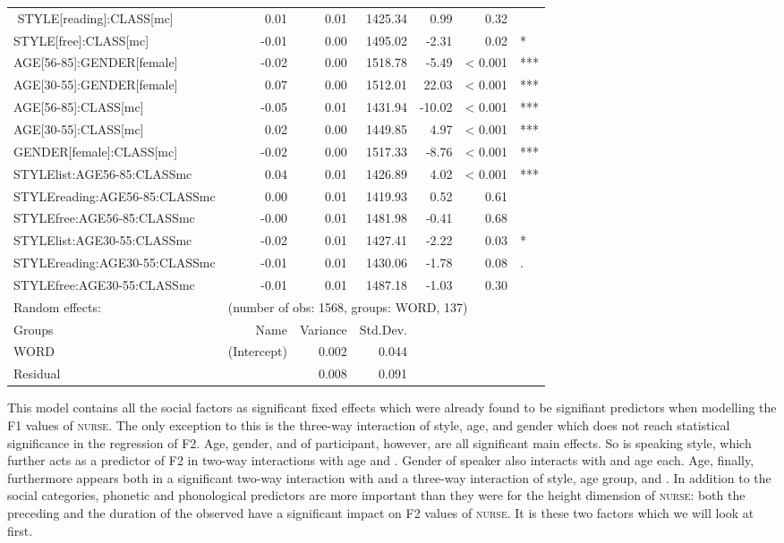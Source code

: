 {\begin{longtable}[c]{p{}rrrrrl}
$$		STYLE[reading]:CLASS[mc] & 0.01 & 0.01 & 1425.34 & 0.99 & 0.32 & \\ 
		STYLE[free]:CLASS[mc] & -0.01 & 0.00 & 1495.02 & -2.31 & 0.02 & *\\ 
		AGE[56-85]:GENDER[female] & -0.02 & 0.00 & 1518.78 & -5.49 & < 0.001 & *** \\ 
		AGE[30-55]:GENDER[female] & 0.07 & 0.00 & 1512.01 & 22.03 & < 0.001 & *** \\ 
		AGE[56-85]:CLASS[mc] & -0.05 & 0.01 & 1431.94 & -10.02 & < 0.001 & *** \\ 
		AGE[30-55]:CLASS[mc] & 0.02 & 0.00 & 1449.85 & 4.97 & < 0.001 & *** \\ 
		GENDER[female]:CLASS[mc] & -0.02 & 0.00 & 1517.33 & -8.76 & < 0.001 & *** \\ 
		STYLElist:AGE56-85:CLASSmc & 0.04 & 0.01 & 1426.89 & 4.02 & < 0.001 & *** \\ 
		STYLEreading:AGE56-85:CLASSmc & 0.00 & 0.01 & 1419.93 & 0.52 & 0.61 & \\ 
		STYLEfree:AGE56-85:CLASSmc & -0.00 & 0.01 & 1481.98 & -0.41 & 0.68 & \\ 
		STYLElist:AGE30-55:CLASSmc & -0.02 & 0.01 & 1427.41 & -2.22 & 0.03 & * \\ 
		STYLEreading:AGE30-55:CLASSmc & -0.01 & 0.01 & 1430.06 & -1.78 & 0.08 & .\\ 
		STYLEfree:AGE30-55:CLASSmc & -0.01 & 0.01 & 1487.18 & -1.03 & 0.30 & \\ 
		\hline
		Random effects: & \multicolumn{6}{l}{(number of obs: 1568, groups: WORD, 137)} \\
		Groups &         Name & Variance &      Std.Dev. & & & \\
		WORD &  (Intercept) & 0.002 & 0.044 & & & \\
		Residual  &         & 0.008 & 0.091 & & & \\
		\hline
	\end{longtable}
	
}


This model contains all the social factors as significant fixed effects which were already found to be signifiant predictors when modelling the F1 values of \textsc{nurse}.
The only exception to this is the three-way interaction of style, age, and gender which does not reach statistical significance in the regression of F2.
Age, gender, and  of participant, however, are all significant main effects.
So is speaking style, which further acts as a predictor of F2 in two-way interactions with age and .
Gender of speaker also interacts with  and age each.
Age, finally, furthermore appears both in a significant two-way interaction with  and a three-way interaction of style, age group, and .
In addition to the social categories, phonetic and phonological predictors are more important than they were for the height dimension of \textsc{nurse}: both the preceding  and the duration of the observed  have a significant impact on F2 values of \textsc{nurse}.
It is these two factors which we will look at first.

